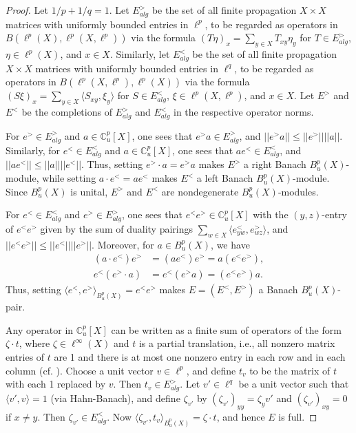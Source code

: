 \documentclass[a4,11pt]{amsart}
\theoremstyle{remark}
\begin{document}
\begin{proof} 

Let $1/p+1/q=1$.
Let $E^>_{alg}$ be the set of all finite propagation $X\times X$ matrices with uniformly bounded entries in $\ell^p$, to be regarded as operators in $B(\ell^p(X),\ell^p(X,\ell^p))$ via the formula $(T\eta)_x=\sum_{y\in X}T_{xy}\eta_y$ for $T\in E^>_{alg}$, $\eta\in\ell^p(X)$, and $x\in X$.
Similarly, let $E^<_{alg}$ be the set of all finite propagation $X\times X$ matrices with uniformly bounded entries in $\ell^q$, to be regarded as operators in $B(\ell^p(X,\ell^p),\ell^p(X))$ via the formula $(S\xi)_x=\sum_{y\in X}\langle S_{xy},\xi_y \rangle$ for $S\in E^<_{alg}$, $\xi\in\ell^p(X,\ell^p)$, and $x\in X$.
Let $E^>$ and $E^<$ be the completions of $E^>_{alg}$ and $E^<_{alg}$ in the respective operator norms.

For $e^>\in E^>_{alg}$ and $a\in\mathbb{C}^p_u[X]$, one sees that $e^>a\in E^>_{alg}$, and $||e^>a||\leq||e^>|| ||a||$.
Similarly, for $e^<\in E^<_{alg}$ and $a\in\mathbb{C}^p_u[X]$, one sees that $ae^<\in E^<_{alg}$, and $||ae^<||\leq||a|| ||e^<||$.
Thus, setting $e^>\cdot a=e^>a$ makes $E^>$ a right Banach $B^p_u(X)$-module, while setting $a\cdot e^<=ae^<$ makes $E^<$ a left Banach $B^p_u(X)$-module. 
Since $B^p_u(X)$ is unital, $E^>$ and $E^<$ are nondegenerate $B^p_u(X)$-modules.

For $e^<\in E^<_{alg}$ and $e^>\in E^>_{alg}$, one sees that $e^<e^>\in\mathbb{C}_u^p[X]$ with the $(y,z)$-entry of $e^<e^>$ given by the sum of duality pairings $\sum_{w\in X}\langle e^<_{yw},e^>_{wz}\rangle$, and $||e^<e^>||\leq ||e^<|| ||e^>||$. 
Moreover, for $a\in B^p_u(X)$, we have
\begin{align*}
(a\cdot e^<)e^> &= (ae^<)e^>=a(e^<e^>), \\
e^<(e^>\cdot a) &= e^<(e^>a)=(e^<e^>)a.
\end{align*}
Thus, setting $\langle e^<,e^> \rangle_{B^p_u(X)}=e^<e^>$ makes $E=(E^<,E^>)$ a Banach $B^p_u(X)$-pair. 



Any operator in $\mathbb{C}^p_u[X]$ can be written as a finite sum of operators of the form $\zeta\cdot t$, where $\zeta\in\ell^\infty(X)$ and $t$ is a partial translation, i.e., all nonzero matrix entries of $t$ are 1 and there is at most one nonzero entry in each row and in each column (cf. \cite[Definition 2.9]{Chung21a}).
Choose a unit vector $v\in\ell^p$, and define $t_v$ to be the matrix of $t$ with each 1 replaced by $v$. Then $t_v\in E^>_{alg}$.
Let $v'\in\ell^q$ be a unit vector such that $\langle v',v \rangle=1$ (via Hahn-Banach), and define $\zeta_{v'}$ by $(\zeta_{v'})_{yy}=\zeta_yv'$ and $(\zeta_{v'})_{xy}=0$ if $x\neq y$. Then $\zeta_{v'}\in E^<_{alg}$.
Now $\langle \zeta_{v'},t_v \rangle_{B^p_u(X)}=\zeta\cdot t$, and hence $E$ is full.


\end{proof}
\end{document}
